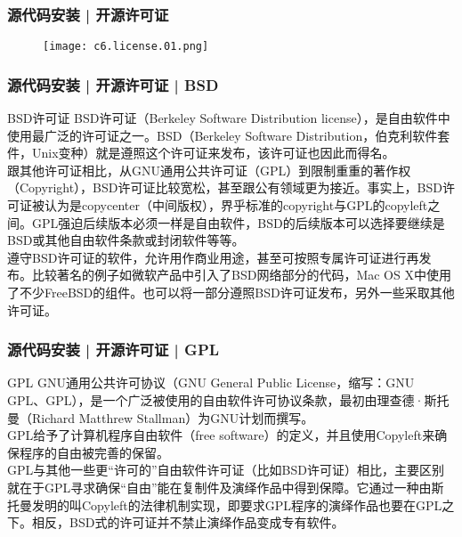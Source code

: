 \begin{frame}
  \frametitle{源代码安装 | 开源许可证}
  \begin{figure}
    \centering
    \texttt{[image: c6.license.01.png]}
  \end{figure}
\end{frame}

\begin{frame}
  \frametitle{源代码安装 | 开源许可证 | BSD}
  \begin{block}{BSD许可证}
    \alert{BSD}许可证（Berkeley Software Distribution license），是自由软件中使用最广泛的许可证之一。BSD（Berkeley Software Distribution，伯克利软件套件，Unix变种）就是遵照这个许可证来发布，该许可证也因此而得名。\\
    跟其他许可证相比，从GNU通用公共许可证（GPL）到限制重重的著作权（Copyright），BSD许可证比较宽松，甚至跟公有领域更为接近。事实上，BSD许可证被认为是copycenter（中间版权），界乎标准的copyright与GPL的copyleft之间。GPL强迫后续版本必须一样是自由软件，BSD的后续版本可以选择要继续是BSD或其他自由软件条款或封闭软件等等。\\
    遵守BSD许可证的软件，允许用作商业用途，甚至可按照专属许可证进行再发布。比较著名的例子如微软产品中引入了BSD网络部分的代码，Mac OS X中使用了不少FreeBSD的组件。也可以将一部分遵照BSD许可证发布，另外一些采取其他许可证。
  \end{block}
\end{frame}

\begin{frame}
  \frametitle{源代码安装 | 开源许可证 | GPL}
  \begin{block}{GPL}
    GNU通用公共许可协议（GNU General Public License，缩写：GNU GPL、GPL），是一个广泛被使用的自由软件许可协议条款，最初由理查德·斯托曼（Richard Matthrew Stallman）为GNU计划而撰写。\\
    \alert{GPL}给予了计算机程序自由软件（free software）的定义，并且使用Copyleft来确保程序的自由被完善的保留。\\
    GPL与其他一些更“许可的”自由软件许可证（比如BSD许可证）相比，主要区别就在于GPL寻求确保“自由”能在复制件及演绎作品中得到保障。它通过一种由斯托曼发明的叫Copyleft的法律机制实现，即要求GPL程序的演绎作品也要在GPL之下。相反，BSD式的许可证并不禁止演绎作品变成专有软件。
  \end{block}
\end{frame}

